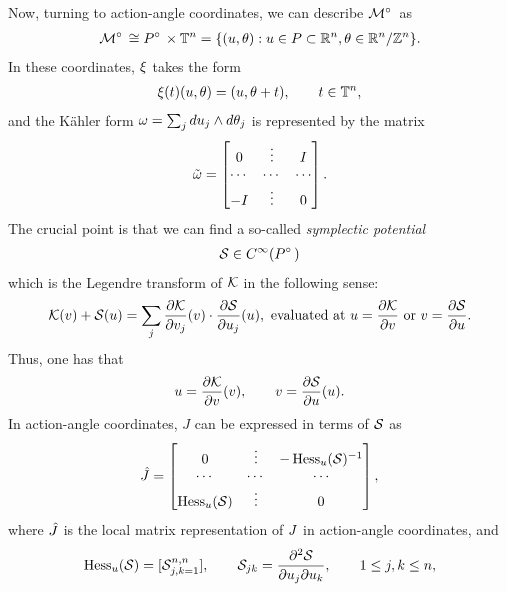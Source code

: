 \documentclass[notas.tex]{subfiles}
\begin{document}
	Now, turning to action-angle coordinates, we can describe $\mfld^\circ$ as
	\begin{align} \label{eq_aa_coords}
		\mfld^\circ \cong \poly^\circ \times \torus^n = \{(u,\theta): u\in\poly \subset \reals^n, \theta \in \reals^n / \ints^n \}.
	\end{align}
	In these coordinates, $\xi$ takes the form
	\begin{align*}
		\xi(t)(u,\theta) = (u,\theta+t), \qquad t \in \mathbb{T}^n,
	\end{align*}
	and the Kähler form $\omega = \sum_{j} du_j \wedge d\theta_j$ is represented by the matrix
	\begin{align} \label{eq_sform_aa}
		\tilde{\omega} = \begin{bmatrix}
			0 & \vdots & I\\
			\cdots & \cdots & \cdots \\
			-I & \vdots & 0
		\end{bmatrix}.
	\end{align}
	The crucial point is that we can find a so-called \emph{symplectic potential}
	\begin{align} \label{eq_spot}
		\sgen \in C^\infty(P^\circ)
	\end{align}
	which is the Legendre transform of $\mathcal{K}$ in the following sense:
	\begin{align} \label{eq_legendre_transform}
		\mathcal{K}(v) + \mathcal{S}(u) = \sum_{j}\frac{\partial \mathcal{K}}{\partial v_j}(v) \cdot \frac{\partial \mathcal{S}}{\partial u_j}(u),\text{ evaluated at } u = \frac{\partial \mathcal{K}}{\partial v} \text{ or } v = \frac{\partial \mathcal{S}}{\partial u}.
	\end{align}
	Thus, one has that 
	\begin{align} \label{eq_coordinate_change}
		u = \frac{\partial \mathcal{K}}{\partial v}(v), \qquad v = \frac{\partial \mathcal{S}}{\partial u}(u).
	\end{align}
	In action-angle coordinates, $J$ can be expressed in terms of $\mathcal{S}$ as
	\begin{align} \label{ga_cstruct}
		\hat{J} = \begin{bmatrix}
			0 & \vdots & -\operatorname{Hess}_u(\mathcal{S})^{-1}\\
			\cdots & \cdots & \cdots \\
			\operatorname{Hess}_u(\mathcal{S}) & \vdots & 0
		\end{bmatrix},
	\end{align}
	where $\hat {J}$ is the local matrix representation of $J$ in action-angle coordinates, and
	\begin{align*}
		\operatorname{Hess}_u(\mathcal{S}) = [\mathcal{S}_{j,k = 1}^{n,n}], \qquad \mathcal{S}_{jk}=\frac{\partial^2 \mathcal{S}}{\partial u_j \partial u_k}, \qquad 1 \leq j,k \leq n,
	\end{align*}
\end{document}
